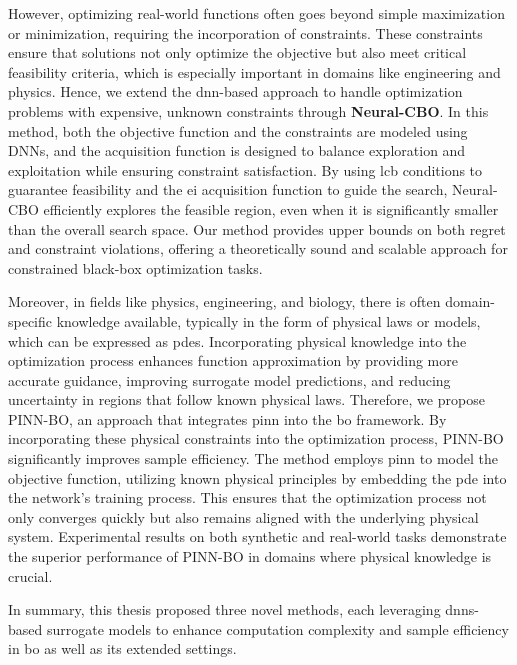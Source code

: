 However, optimizing real-world functions often goes beyond simple maximization or minimization, requiring the incorporation of constraints. These constraints ensure that solutions not only optimize the objective but also meet critical feasibility criteria, which is especially important in domains like engineering and physics. Hence, we extend the \ac{dnn}-based approach to handle optimization problems with expensive, unknown constraints through \textbf{Neural-CBO}. In this method, both the objective function and the constraints are modeled using DNNs, and the acquisition function is designed to balance exploration and exploitation while ensuring constraint satisfaction. By using \ac{lcb} conditions to guarantee feasibility and the \ac{ei} acquisition function to guide the search, Neural-CBO efficiently explores the feasible region, even when it is significantly smaller than the overall search space. Our method provides upper bounds on both regret and constraint violations, offering a theoretically sound and scalable approach for constrained black-box optimization tasks.

Moreover, in fields like physics, engineering, and biology, there is often domain-specific knowledge available, typically in the form of physical laws or models, which can be expressed as \acp{pde}. Incorporating physical knowledge into the optimization process enhances function approximation by providing more accurate guidance, improving surrogate model predictions, and reducing uncertainty in regions that follow known physical laws. Therefore, we propose PINN-BO, an approach that integrates \ac{pinn} into the \ac{bo} framework.  By incorporating these physical constraints into the optimization process, PINN-BO significantly improves sample efficiency. The method employs \ac{pinn} to model the objective function, utilizing known physical principles by embedding the \ac{pde} into the network's training process. This ensures that the optimization process not only converges quickly but also remains aligned with the underlying physical system. Experimental results on both synthetic and real-world tasks demonstrate the superior performance of PINN-BO in domains where physical knowledge is crucial. 

In summary, this thesis proposed three novel methods, each leveraging \acp{dnn}-based surrogate models to enhance computation complexity and sample efficiency in \ac{bo} as well as its extended settings.

